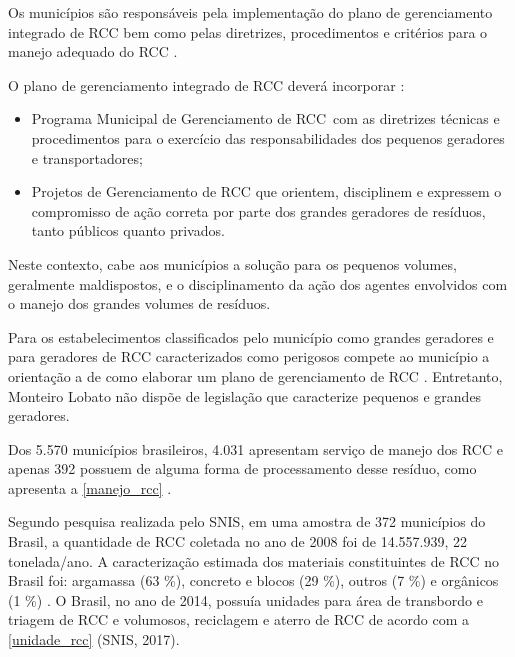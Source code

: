 	
	
	Os municípios são responsáveis pela implementação do plano de gerenciamento integrado de RCC bem como pelas diretrizes, procedimentos e critérios para o manejo adequado do RCC \cite{conama:307}. 
	
	O plano de gerenciamento integrado de RCC deverá incorporar \cite{conama:307}:
	
	\begin{itemize}
		\item Programa Municipal de Gerenciamento de RCC com as diretrizes técnicas e procedimentos para o exercício das responsabilidades dos pequenos geradores e transportadores;
		\item Projetos de Gerenciamento de RCC que orientem, disciplinem e expressem o compromisso de ação correta por parte dos grandes geradores de resíduos, tanto públicos quanto privados.
	\end{itemize}

	Neste contexto, cabe aos municípios a solução para os pequenos volumes, geralmente maldispostos, e o disciplinamento da ação dos agentes envolvidos com o manejo dos grandes volumes de resíduos.

	Para os estabelecimentos classificados pelo município como grandes geradores e para geradores de RCC caracterizados como perigosos compete ao município a orientação a de como elaborar um plano de gerenciamento de RCC \cite{brasil:12305}. Entretanto, Monteiro Lobato não dispõe de legislação que caracterize pequenos e grandes geradores.

	Dos 5.570 municípios brasileiros, 4.031 apresentam serviço de manejo dos RCC e apenas 392 possuem de alguma forma de processamento desse resíduo, como apresenta a \autoref{manejo_rcc} \cite{IPEA2012b}. 
	
	
	
	Segundo pesquisa realizada pelo SNIS, em uma amostra de 372 municípios do Brasil, a quantidade de RCC coletada no ano de 2008 foi de 14.557.939, 22 tonelada/ano. A caracterização estimada dos materiais constituintes de RCC no Brasil foi: argamassa (63 \%), concreto e blocos (29 \%), outros (7 \%) e orgânicos (1 \%) \cite{IPEA2012b}. O Brasil, no ano de 2014, possuía unidades para área de transbordo e triagem de RCC e volumosos, reciclagem e aterro de RCC de acordo com a \autoref{unidade_rcc} (SNIS, 2017). 
	
	
	
